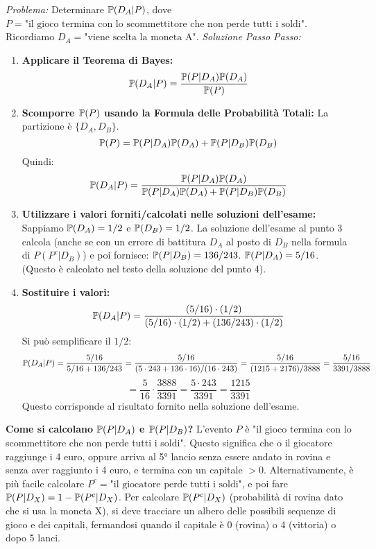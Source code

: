 \documentclass[12pt,a4paper]{article}
\begin{document}
\begin{example}
\textit{Problema:} Determinare $\mathbb{P}(D_A|P)$, dove $P = \text{"il gioco termina con lo scommettitore che non perde tutti i soldi"}$.
Ricordiamo $D_A = \text{"viene scelta la moneta A"}$.
\textit{Soluzione Passo Passo:}
\begin{enumerate}
    \item \textbf{Applicare il Teorema di Bayes:}
    \[ \mathbb{P}(D_A|P) = \frac{\mathbb{P}(P|D_A)\mathbb{P}(D_A)}{\mathbb{P}(P)} \]
    \item \textbf{Scomporre $\mathbb{P}(P)$ usando la Formula delle Probabilità Totali:}
    La partizione è $\{D_A, D_B\}$.
    \[ \mathbb{P}(P) = \mathbb{P}(P|D_A)\mathbb{P}(D_A) + \mathbb{P}(P|D_B)\mathbb{P}(D_B) \]
    Quindi:
    \[ \mathbb{P}(D_A|P) = \frac{\mathbb{P}(P|D_A)\mathbb{P}(D_A)}{\mathbb{P}(P|D_A)\mathbb{P}(D_A) + \mathbb{P}(P|D_B)\mathbb{P}(D_B)} \]
    \item \textbf{Utilizzare i valori forniti/calcolati nelle soluzioni dell'esame:}
    Sappiamo $\mathbb{P}(D_A) = 1/2$ e $\mathbb{P}(D_B) = 1/2$.
    La soluzione dell'esame al punto 3 calcola (anche se con un errore di battitura $D_A$ al posto di $D_B$ nella formula di $P(P^c|D_B)$) e poi fornisce:
    $\mathbb{P}(P|D_B) = 136/243$.
    $\mathbb{P}(P|D_A) = 5/16$. (Questo è calcolato nel testo della soluzione del punto 4).
    \item \textbf{Sostituire i valori:}
    \[ \mathbb{P}(D_A|P) = \frac{(5/16) \cdot (1/2)}{(5/16) \cdot (1/2) + (136/243) \cdot (1/2)} \]
    Si può semplificare il $1/2$:
    \[ \mathbb{P}(D_A|P) = \frac{5/16}{5/16 + 136/243} = \frac{5/16}{(5 \cdot 243 + 136 \cdot 16)/(16 \cdot 243)} = \frac{5/16}{(1215 + 2176)/3888} = \frac{5/16}{3391/3888} \]
    \[ = \frac{5}{16} \cdot \frac{3888}{3391} = \frac{5 \cdot 243}{3391} = \frac{1215}{3391} \]
    Questo corrisponde al risultato fornito nella soluzione dell'esame.
\end{enumerate}
\textbf{Come si calcolano $\mathbb{P}(P|D_A)$ e $\mathbb{P}(P|D_B)$?}
L'evento $P$ è "il gioco termina con lo scommettitore che non perde tutti i soldi". Questo significa che o il giocatore raggiunge i 4 euro, oppure arriva al 5° lancio senza essere andato in rovina e senza aver raggiunto i 4 euro, e termina con un capitale $>0$.
Alternativamente, è più facile calcolare $P^c = \text{"il giocatore perde tutti i soldi"}$, e poi fare $\mathbb{P}(P|D_X) = 1 - \mathbb{P}(P^c|D_X)$.
Per calcolare $\mathbb{P}(P^c|D_X)$ (probabilità di rovina dato che si usa la moneta X), si deve tracciare un albero delle possibili sequenze di gioco e dei capitali, fermandosi quando il capitale è 0 (rovina) o 4 (vittoria) o dopo 5 lanci.

\end{example}
\end{document}
